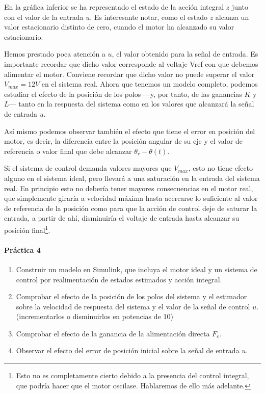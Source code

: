 \documentclass[10pt,a4paper]{report}
\begin{document}
En la gráfica inferior se ha representado el estado de la  acción integral $z$ junto con el valor de la entrada $u$. Es interesante notar, como el estado $z$ alcanza un valor estacionario distinto de cero, cuando el motor ha alcanzado su valor estacionario.

Hemos prestado poca atención a $u$, el valor obtenido para la señal de entrada. Es importante recordar que dicho valor corresponde al voltaje Vref con que debemos alimentar el motor.  Conviene recordar que dicho valor no puede superar el valor $V_{max}=12V$ en el sistema real. Ahora que tenemos un modelo completo, podemos estudiar el efecto de la posición de los polos ---y, por tanto, de las ganancias $K$ y $L$--- tanto en la respuesta del sistema como en los valores que alcanzará la señal de entrada $u$. 

Así mismo podemos observar también el efecto que tiene el error en posición del motor, es decir, la diferencia entre la posición angular de su eje y el valor de referencia o valor final que debe alcanzar $\theta_r-\theta(t)$.

Si el sistema de control demanda valores mayores que $V_{max}$, esto no tiene efecto alguno en el sistema ideal, pero llevará a una saturación en la entrada del sistema real. En principio esto no debería tener mayores consecuencias en el motor real, que simplemente giraría a velocidad máxima hasta acercarse lo suficiente al valor de referencia de la posición como para que la acción de control deje de saturar la entrada, a partir de ahí, disminuiría el voltaje de entrada hasta alcanzar su posición final\footnote{Esto no es completamente cierto debido a la presencia del control integral, que podría hacer que el motor oscilase. Hablaremos de ello más adelante.}.
  
\paragraph{Práctica 4}
\begin{enumerate}
\item Construir un modelo en Simulink, que incluya el motor ideal y un sistema de control por realimentación de estados estimados y acción integral. 
\item Comprobar el efecto de la posición de los polos del sistema y el estimador sobre la velocidad de respuesta del sistema y el valor de la señal de control $u$. (incrementarlos o disminuirlos en potencias de 10)
\item Comprobar el efecto de la ganancia de la alimentación directa $F_c$.
\item Observar el efecto del error de posición inicial sobre la señal de entrada $u$. 
\end{enumerate}
\end{document}
